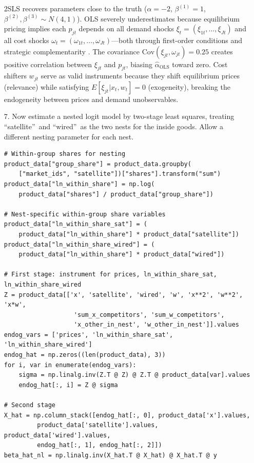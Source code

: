 \documentclass[english,11pt]{article}
\begin{document}
\begin{enumerate}
2SLS recovers parameters close to the truth ($\alpha = -2$, $\beta^{(1)} = 1$, $\beta^{(2)}, \beta^{(3)} \sim N(4,1)$). OLS severely underestimates because equilibrium pricing implies each $p_{jt}$ depends on all demand shocks $\xi_t = (\xi_{1t}, \ldots, \xi_{Jt})$ and all cost shocks $\omega_t = (\omega_{1t}, \ldots, \omega_{Jt})$---both through first-order conditions and strategic complementarity \citep{berry2021foundations}. The covariance $\text{Cov}(\xi_{jt}, \omega_{jt}) = 0.25$ creates positive correlation between $\xi_{jt}$ and $p_{jt}$, biasing $\hat{\alpha}_{\text{OLS}}$ toward zero. Cost shifters $w_{jt}$ serve as valid instruments because they shift equilibrium prices (relevance) while satisfying $E[\xi_{jt} | x_t, w_t] = 0$ (exogeneity), breaking the endogeneity between prices and demand unobservables.


\item[7.] Now estimate a nested logit model by two-stage least squares,
treating \textquotedblleft satellite\textquotedblright\ and
\textquotedblleft wired\textquotedblright\ as the two nests for the inside
goods. Allow a different nesting parameter for each nest.

\begin{verbatim}
# Within-group shares for nesting
product_data["group_share"] = product_data.groupby(
    ["market_ids", "satellite"])["shares"].transform("sum")
product_data["ln_within_share"] = np.log(
    product_data["shares"] / product_data["group_share"])

# Nest-specific within-group share variables
product_data["ln_within_share_sat"] = (
    product_data["ln_within_share"] * product_data["satellite"])
product_data["ln_within_share_wired"] = (
    product_data["ln_within_share"] * product_data["wired"])

# First stage: instrument for prices, ln_within_share_sat, ln_within_share_wired
Z = product_data[['x', 'satellite', 'wired', 'w', 'x**2', 'w**2', 'x*w',
                   'sum_x_competitors', 'sum_w_competitors', 
                   'x_other_in_nest', 'w_other_in_nest']].values
endog_vars = ['prices', 'ln_within_share_sat', 'ln_within_share_wired']
endog_hat = np.zeros((len(product_data), 3))
for i, var in enumerate(endog_vars):
    sigma = np.linalg.inv(Z.T @ Z) @ Z.T @ product_data[var].values
    endog_hat[:, i] = Z @ sigma

# Second stage
X_hat = np.column_stack([endog_hat[:, 0], product_data['x'].values,
         product_data['satellite'].values, product_data['wired'].values,
         endog_hat[:, 1], endog_hat[:, 2]])
beta_hat_nl = np.linalg.inv(X_hat.T @ X_hat) @ X_hat.T @ y


\end{verbatim}
\end{enumerate}
\end{document}
